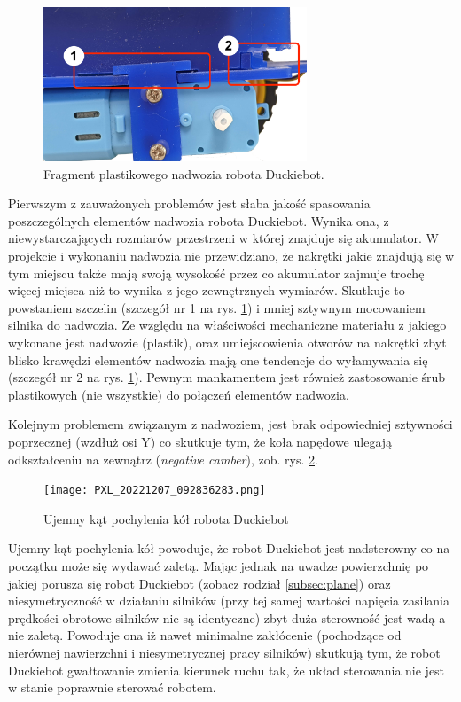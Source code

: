 \documentclass{svproc}
\begin{document}
\begin{figure}
    \centering
    \includegraphics[width=0.7\textwidth]{chassis1.png}
    \caption{Fragment plastikowego nadwozia robota Duckiebot.}
    \label{fig:chassis-problem}
\end{figure}

Pierwszym z zauważonych problemów jest słaba jakość spasowania poszczególnych elementów nadwozia robota Duckiebot. Wynika ona, z niewystarczających rozmiarów przestrzeni w której znajduje się akumulator. W projekcie i wykonaniu nadwozia nie przewidziano, że nakrętki jakie znajdują się w tym miejscu także mają swoją wysokość przez co akumulator zajmuje trochę więcej miejsca niż to wynika z jego zewnętrznych wymiarów. Skutkuje to powstaniem szczelin (szczegół nr 1 na rys. \ref{fig:chassis-problem}) i mniej sztywnym mocowaniem silnika do nadwozia. Ze względu na właściwości mechaniczne materiału z jakiego wykonane jest nadwozie (plastik), oraz umiejscowienia otworów na nakrętki zbyt blisko krawędzi elementów nadwozia mają one tendencje do wyłamywania się (szczegół nr 2 na rys. \ref{fig:chassis-problem}). Pewnym mankamentem jest również zastosowanie śrub plastikowych (nie wszystkie) do połączeń elementów nadwozia.

Kolejnym problemem związanym z nadwoziem, jest brak odpowiedniej sztywności poprzecznej (wzdłuż osi Y) co skutkuje tym, 
że koła napędowe ulegają odkształceniu na zewnątrz (\emph{negative camber}), zob. rys. \ref{fig:negative-camber}. 

\begin{figure}
    \centering
    \texttt{[image: PXL\_20221207\_092836283.png]}
    \caption{Ujemny kąt pochylenia kół robota Duckiebot}
    \label{fig:negative-camber}
\end{figure}

Ujemny kąt pochylenia kół powoduje, że robot Duckiebot jest nadsterowny co na początku może się wydawać zaletą. Mając jednak na uwadze powierzchnię po jakiej porusza się robot Duckiebot (zobacz rodział \ref{subsec:plane}) oraz niesymetryczność w działaniu silników (przy tej samej wartości napięcia zasilania prędkości obrotowe silników nie są identyczne) zbyt duża sterowność jest wadą a nie zaletą. Powoduje ona iż nawet minimalne zakłócenie (pochodzące od nierównej nawierzchni i niesymetrycznej pracy silników) skutkują tym, że robot Duckiebot gwałtowanie zmienia kierunek ruchu tak, że układ sterowania nie jest w stanie poprawnie sterować robotem. 
\end{document}
